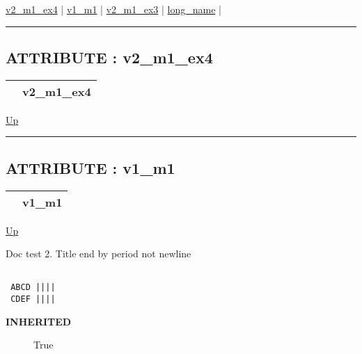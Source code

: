 \par


\hyperlink{ecldoc:intest.example_4.mod_1.v2_m1_ex4}{v2\_m1\_ex4}  |
\hyperlink{ecldoc:example_3.mod_1.v1_m1}{v1\_m1}  |
\hyperlink{ecldoc:example_3.mod_1.v2_m1_ex3}{v2\_m1\_ex3}  |
\hyperlink{ecldoc:example_3.mod_1.long_name}{long\_name}  |

\rule{\textwidth}{0.4pt}

\subsection*{ATTRIBUTE : v2\_m1\_ex4}
\hypertarget{ecldoc:intest.example_4.mod_1.v2_m1_ex4}{}

{\renewcommand{\arraystretch}{1.5}
\begin{tabularx}{\textwidth}{|>{\raggedright\arraybackslash}l|X|}
\hline
\hspace{0pt} & v2\_m1\_ex4 \\
\hline
\end{tabularx}
}

\hyperlink{ecldoc:intest.example_4.mod_1}{Up}

\par


\rule{\textwidth}{0.4pt}
\subsection*{ATTRIBUTE : v1\_m1}
\hypertarget{ecldoc:example_3.mod_1.v1_m1}{}

{\renewcommand{\arraystretch}{1.5}
\begin{tabularx}{\textwidth}{|>{\raggedright\arraybackslash}l|X|}
\hline
\hspace{0pt} & v1\_m1 \\
\hline
\end{tabularx}
}

\hyperlink{ecldoc:intest.example_4.mod_1}{Up}

\par
Doc test 2. Title end by period not newline 
\begin{verbatim}

 ABCD ||||
 CDEF ||||\end{verbatim}



\par
\begin{description}
\item [\textbf{INHERITED}] True
\end{description}

